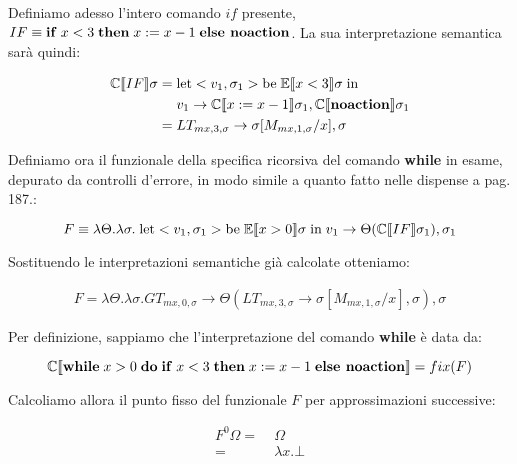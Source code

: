     Definiamo adesso l'intero comando $if$ presente, $IF \equiv \mbox{\textbf{if}}\; x<3\; \mbox{\textbf{then}}\; x:=x-1\; \mbox{\textbf{else noaction}}$. La sua interpretazione semantica sarà quindi:
    
    \begin{align*}
        \mathbb{C}\llbracket IF \rrbracket\sigma =\;& \mbox{let} <v_1,\sigma_1> \mbox{be}\; \mathbb{E}\llbracket x<3 \rrbracket\sigma\; \mbox{in}\\
        & v_1\rightarrow\mathbb{C}\llbracket x:=x-1 \rrbracket\sigma_1,\mathbb{C}\llbracket \mbox{\textbf{noaction}} \rrbracket\sigma_1\\
        =\;& LT_{mx,3,\sigma}\rightarrow \sigma[M_{mx,1,\sigma}/x], \sigma
    \end{align*}
    
    Definiamo ora il funzionale della specifica ricorsiva del comando \textbf{while} in esame, depurato da controlli d'errore, in modo simile a quanto fatto nelle dispense a pag. 187.:
    
    \begin{equation*}
        F \equiv \lambda\Theta.\lambda\sigma.\; \mbox{let} <v_1,\sigma_1> \mbox{be}\; \mathbb{E}\llbracket x>0 \rrbracket\sigma\; \mbox{in}\; v_1 \rightarrow \Theta(\mathbb{C}\llbracket IF \rrbracket\sigma_1), \sigma_1
    \end{equation*}
    
    Sostituendo le interpretazioni semantiche già calcolate otteniamo:
    
    \begin{align*}
        F = \lambda\Theta.\lambda\sigma. GT_{mx,0,\sigma} \rightarrow \Theta(LT_{mx,3,\sigma}\rightarrow \sigma[M_{mx,1,\sigma}/x], \sigma), \sigma
    \end{align*}
    
    Per definizione, sappiamo che l'interpretazione del comando \textbf{while} è data da:
    
    \begin{equation*}
        \mathbb{C}\llbracket \mbox{\textbf{while}}\; x>0\; \mbox{\textbf{do}}\; \mbox{\textbf{if}}\; x<3\; \mbox{\textbf{then}}\; x:=x-1\; \mbox{\textbf{else noaction}} \rrbracket = fix(F)
    \end{equation*}
    
    Calcoliamo allora il punto fisso del funzionale $F$ per approssimazioni successive:
    
    \begin{align*}
        F^0\Omega =\;& \Omega\\
        =\;& \lambda x.\bot
    \end{align*}
    
